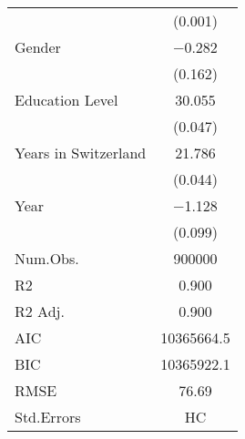 \begin{table}
\begin{tabular}[t]{lc}
 & (\num{0.001})\\
Gender & \num{-0.282}\\
 & (\num{0.162})\\
Education Level & \num{30.055}\\
 & (\num{0.047})\\
Years in Switzerland & \num{21.786}\\
 & (\num{0.044})\\
Year & \num{-1.128}\\
 & (\num{0.099})\\
\midrule
Num.Obs. & \num{900000}\\
R2 & \num{0.900}\\
R2 Adj. & \num{0.900}\\
AIC & \num{10365664.5}\\
BIC & \num{10365922.1}\\
RMSE & \num{76.69}\\
Std.Errors & HC\\
\bottomrule
\end{tabular}
\end{table}
